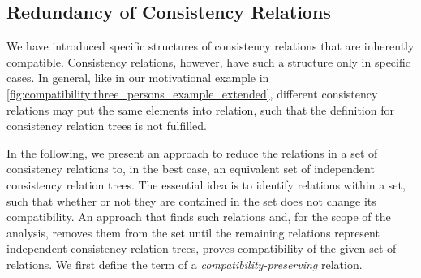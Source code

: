 

\subsection{Redundancy of Consistency Relations}
\label{chap:compatibility:formal_approach:redundancy}


We have introduced specific structures of consistency relations that are inherently compatible.
Consistency relations, however, have such a structure only in specific cases.
In general, like in our motivational example in \autoref{fig:compatibility:three_persons_example_extended}, different consistency relations may put the same elements into relation, such that the definition for consistency relation trees is not fulfilled.

In the following, we present an approach to reduce the relations in a set of consistency relations to, in the best case, an equivalent set of independent consistency relation trees.
The essential idea is to identify relations within a set, such that whether or not they are contained in the set does not change its compatibility.
An approach that finds such relations and, for the scope of the analysis, removes them from the set until the remaining relations represent independent consistency relation trees, proves compatibility of the given set of relations.
We first define the term of a \emph{compatibility-preserving} relation.

